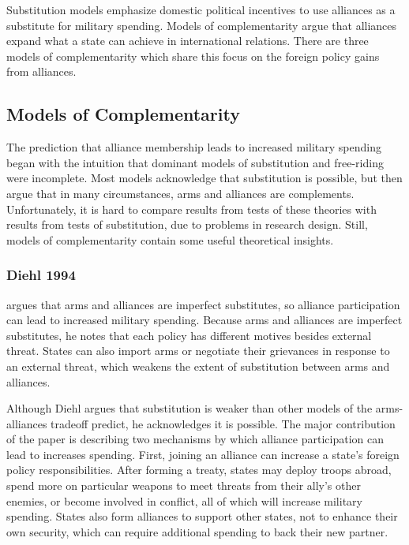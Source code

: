 \documentclass[12pt]{article}
\begin{document}
Substitution models emphasize domestic political incentives to use alliances as a substitute for military spending.  
Models of complementarity argue that alliances expand what a state can achieve in international relations. 
There are three models of complementarity which share this focus on the foreign policy gains from alliances. 



\subsection{Models of Complementarity} 


The prediction that alliance membership leads to increased military spending began with the intuition that dominant models of substitution and free-riding were incomplete. 
Most models acknowledge that substitution is possible, but then argue that in many circumstances, arms and alliances are complements. 
Unfortunately, it is hard to compare results from tests of these theories with results from tests of substitution, due to problems in research design. 
Still, models of complementarity contain some useful theoretical insights. 


\subsubsection{Diehl 1994}


\citet{Diehl1994} argues that arms and alliances are imperfect substitutes, so alliance participation can lead to increased military spending. 
Because arms and alliances are imperfect substitutes, he notes that each policy has different motives besides external threat. 
States can also import arms or negotiate their grievances in response to an external threat, which weakens the extent of substitution between arms and alliances. 


Although Diehl argues that substitution is weaker than other models of the arms-alliances tradeoff predict, he acknowledges it is possible.
The major contribution of the paper is describing two mechanisms by which alliance participation can lead to increases spending. 
First, joining an alliance can increase a state's foreign policy responsibilities. 
After forming a treaty, states may deploy troops abroad, spend more on particular weapons to meet threats from their ally's other enemies, or become involved in conflict, all of which will increase military spending. 
States also form alliances to support other states, not to enhance their own security, which can require additional spending to back their new partner. 
\end{document}
